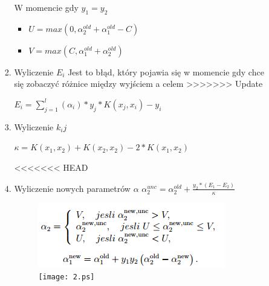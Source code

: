 \documentclass[[10pt,a4paper]{article}
\begin{document}
\begin{enumerate}
\begin{itemize}
\begin{enumerate}
 
W momencie gdy $y_{1}=y_{2}$
\begin{itemize}
\item$ U = max(0,\alpha_{2}^{old} + \alpha_{1}^{old} - C)$
 \item $ V = max(C, \alpha_{1}^{old} + \alpha_{2}^{old})$
 
\end{itemize}
\item Wyliczenie $E_i$ Jest to błąd, który pojawia się w momencie gdy chce się zobaczyć różnice między wyjściem a celem
>>>>>>> Update

$ E_i = \sum_{j=1}^{l}(\alpha_{i})*y_{j}*K(x_j,x_i)-y_i$

\item Wyliczenie $k_ij$

$\kappa = K(x_1,x_2) + K(x_2,x_2) - 2*K(x_1,x_2)$

<<<<<<< HEAD
\item Wyliczenie nowych parametrów $\alpha$ \newline
$\alpha_{2}^{unc} = \alpha_{2}^{old} + \frac{y_2*(E_1-E_2)}{\kappa}$
\begin{figure}[h] \begin{center} \ifpdf \includegraphics{2.png} \else \texttt{[image: 2.ps]} \fi \end{center} \end{figure}

\end{enumerate}


\end{itemize}
\end{enumerate}
\end{document}
